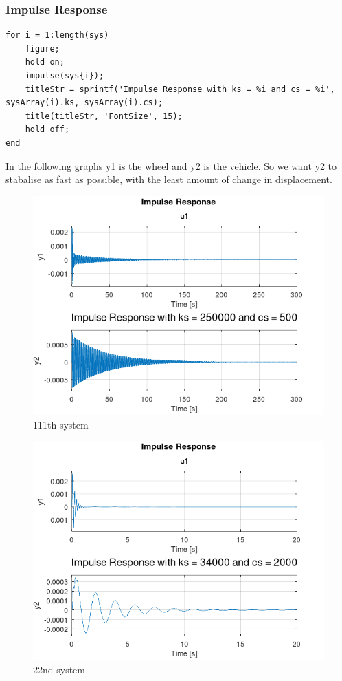 \documentclass[11pt]{article}
\begin{document}
\subsubsection{Impulse Response}
\label{sec:orge1b9b37}
\begin{verbatim}
for i = 1:length(sys)
    figure;
    hold on;
    impulse(sys{i});
    titleStr = sprintf('Impulse Response with ks = %i and cs = %i', sysArray(i).ks, sysArray(i).cs);
    title(titleStr, 'FontSize', 15);
    hold off;
end
\end{verbatim}
In the following graphs y1 is the wheel and y2 is the vehicle. So we want y2 to stabalise as fast as possible, with the least amount of change in displacement.


\begin{figure}[H]
    \centering
    \includegraphics[width=.9\linewidth]{ENG204-Assignment-2-Impulse-Response-111.png}
    \caption{111th system}
    \label{fig:impulse_response_111}
\end{figure}

\begin{figure}[H]
    \centering
    \includegraphics[width=.9\linewidth]{ENG204-Assignment-2-Impulse-Response-22.png}
    \caption{22nd system}
    \label{fig:impulse_response_22}
  \end{figure}
\end{document}
